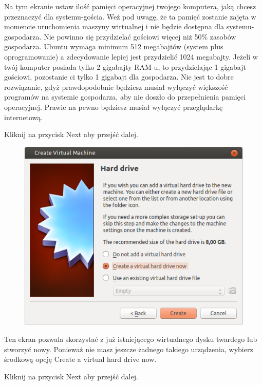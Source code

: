 Na tym ekranie ustaw ilość pamięci operacyjnej twojego komputera, jaką chcesz przeznaczyć dla systemu-gościa. Weź pod uwagę, że ta pamięć zostanie zajęta w momencie uruchomienia maszyny wirtualnej i nie będzie dostępna dla systemu-gospodarza. Nie powinno się przydzielać gościowi więcej niż 50\% zasobów gospodarza. Ubuntu wymaga minimum 512 megabajtów (system plus oprogramowanie) a zdecydowanie lepiej jest przydzielić 1024 megabajty.
Jeżeli w twój komputer posiada tylko 2 gigabajty RAM-u, to przydzielając 1 gigabajt gościowi, pozostanie ci tylko 1 gigabajt dla gospodarza. Nie jest to dobre rozwiązanie, gdyż prawdopodobnie będziesz musiał wyłączyć większość programów na systemie gospodarza, aby nie doszło do przepełnienia pamięci operacyjnej. Prawie na pewno będziesz musiał wyłączyć przeglądarkę internetową.
\begin{flushright}
Kliknij na przycisk \textcolor{ubuntu_orange}{Next} aby przejść dalej.
\end{flushright}

\begin{figure}
	\vspace{-10pt}
	\includegraphics[width=\linewidth]{images/virtualbox_wizard3.png}
\end{figure}

Ten ekran pozwala skorzystać z już istniejącego wirtualnego dysku twardego lub stworzyć nowy. Ponieważ nie masz jeszcze żadnego takiego urządzenia, wybierz środkową opcję \textcolor{ubuntu_orange}{Create a virtual hard drive now}.
\begin{flushright}
Kliknij na przycisk \textcolor{ubuntu_orange}{Next} aby przejść dalej.
\end{flushright}
\clearpage

